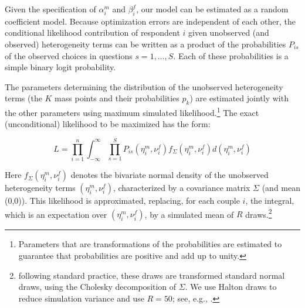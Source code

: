 \documentclass[11pt,letter]{article}
\begin{document}
\par Given the specification of $\alpha_{i}^{m}$ and $\beta_{i}^{f}$, our model can be estimated as a random coefficient model. Because optimization errors are independent of each other, the conditional likelihood contribution of respondent $i$ given unobserved (and observed) heterogeneity terms can be written as a product of the probabilities $P_{is}$ of the observed choices in questions $s=1,\ldots,S$. Each of these probabilities is a simple binary logit probability.

The parameters determining the distribution of the unobserved heterogeneity terms (the $K$ mass points and their probabilities $p_k$) are estimated jointly with the other parameters using maximum simulated likelihood.\footnote{Parameters that are transformations of the probabilities are estimated to guarantee that probabilities are positive and add up to unity.} The exact (unconditional) likelihood to be maximized has the form:

\begin{equation}
L=\prod_{i=1}^n \int_{-\infty}^{\infty} \prod_{s=1}^{S}P_{is}(\eta_i^m, \nu_i^f)f_{\Sigma}(\eta_i^m, \nu_i^f) d(\eta_i^m, \nu_i^f)
\end{equation}

Here $f_{\Sigma}(\eta_i^m, \nu_i^f)$ denotes the bivariate normal density of the unobserved heterogeneity terms $(\eta_i^m, \nu_i^f)$, characterized by a covariance matrix $\Sigma$ (and mean (0,0)). This likelihood is approximated, replacing, for each couple $i$, the integral, which is an expectation over $(\eta_i^m, \nu_i^f)$, by a simulated mean of $R$ draws.\footnote{following standard practice, these draws are transformed standard normal draws, using the Cholesky decomposition of $\Sigma$. We use Halton draws to reduce simulation variance and use $R=50$; see, e.g., \citet{Train2009}.}
\end{document}

